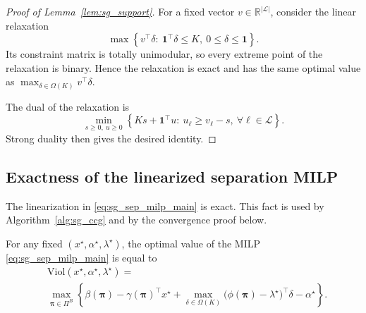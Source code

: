 \begin{proof}[Proof of Lemma~\ref{lem:sg_support}]
For a fixed vector $v\in\mathbb R^{|\mathcal L|}$, consider the linear relaxation
\[
\max\left\{v^\top\delta:\ \mathbf 1^\top\delta\le K,\ 0\le \delta\le \mathbf 1\right\}.
\]
Its constraint matrix is totally unimodular, so every extreme point of the relaxation is binary.
Hence the relaxation is exact and has the same optimal value as
$\max_{\delta\in\Omega(K)} v^\top\delta$.

The dual of the relaxation is
\[
\min_{s\ge 0,\ u\ge 0}
\left\{Ks+\mathbf 1^\top u:\ u_\ell\ge v_\ell-s,\ \forall \ell\in\mathcal L\right\}.
\]
Strong duality then gives the desired identity.
\end{proof}

\subsection{Exactness of the linearized separation MILP}

The linearization in \eqref{eq:sg_sep_milp_main} is exact.
This fact is used by Algorithm~\ref{alg:sg_ccg} and by the convergence proof below.

\begin{proposition}
\label{prop:sg_sep_exact_appendix}
For any fixed $(x^{\star},\alpha^{\star},\lambda^{\star})$, the optimal value of the MILP
\eqref{eq:sg_sep_milp_main} is equal to
\[
\begin{aligned}
    &\mathrm{Viol}(x^{\star},\alpha^{\star},\lambda^{\star})=\\
    &
\max_{\boldsymbol\pi\in\Pi^B}
\left\{
\beta(\boldsymbol\pi)-\gamma(\boldsymbol\pi)^\top x^{\star}
+\max_{\delta\in\Omega(K)}\big(\phi(\boldsymbol\pi)-\lambda^{\star}\big)^\top\delta
-\alpha^{\star}
\right\}.
\end{aligned}
\]
\end{proposition}

